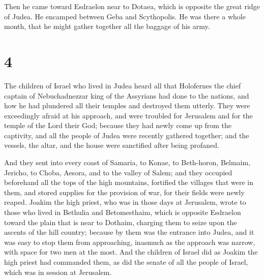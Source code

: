  Then he came toward Esdraelon near to Dotaea, which is
opposite the great ridge of Judea.  He encamped between
Geba and Scythopolis. He was there a whole month, that he might gather
together all the baggage of his army.

\hypertarget{section-3}{%
\section{4}\label{section-3}}

 The children of Israel who lived in Judea heard all that
Holofernes the chief captain of Nebuchadnezzar king of the Assyrians had
done to the nations, and how he had plundered all their temples and
destroyed them utterly.  They were exceedingly afraid at
his approach, and were troubled for Jerusalem and for the temple of the
Lord their God;  because they had newly come up from the
captivity, and all the people of Judea were recently gathered together;
and the vessels, the altar, and the house were sanctified after being
profaned.

 And they sent into every coast of Samaria, to Konae, to
Beth-horon, Belmaim, Jericho, to Choba, Aesora, and to the valley of
Salem;  and they occupied beforehand all the tops of the
high mountains, fortified the villages that were in them, and stored
supplies for the provision of war, for their fields were newly reaped.
 Joakim the high priest, who was in those days at
Jerusalem, wrote to those who lived in Bethulia and Betomesthaim, which
is opposite Esdraelon toward the plain that is near to Dothaim,
 charging them to seize upon the ascents of the hill
country; because by them was the entrance into Judea, and it was easy to
stop them from approaching, inasmuch as the approach was narrow, with
space for two men at the most.  And the children of Israel
did as Joakim the high priest had commanded them, as did the senate of
all the people of Israel, which was in session at Jerusalem.

